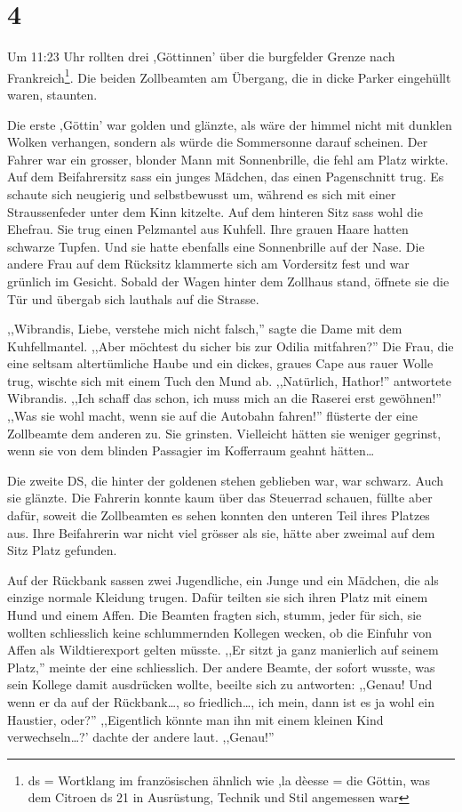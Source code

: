 \section*{4}

Um 11:23 Uhr rollten drei ,Göttinnen' über die burgfelder Grenze nach Frankreich\footnote{ds = Wortklang im französischen ähnlich wie ,la dèesse = die Göttin, was dem Citroen ds 21 in Ausrüstung, Technik und Stil angemessen war}. Die beiden Zollbeamten am Übergang, die in dicke Parker eingehüllt waren, staunten.

 Die erste ,Göttin' war golden und glänzte, als wäre der himmel nicht mit dunklen Wolken verhangen, sondern als würde die Sommersonne darauf scheinen. Der Fahrer war ein grosser, blonder Mann mit Sonnenbrille, die fehl am Platz wirkte. Auf dem Beifahrersitz sass ein junges Mädchen, das einen Pagenschnitt trug. Es schaute sich neugierig und selbstbewusst um, während es sich mit einer Straussenfeder unter dem Kinn kitzelte.  Auf dem hinteren Sitz sass wohl die Ehefrau. Sie trug einen Pelzmantel aus Kuhfell. Ihre grauen Haare hatten schwarze Tupfen. Und sie hatte ebenfalls eine Sonnenbrille auf der Nase. Die andere Frau auf dem Rücksitz klammerte sich am Vordersitz fest und war grünlich im Gesicht. Sobald der Wagen hinter dem Zollhaus stand, öffnete sie die Tür und übergab sich lauthals auf die Strasse. 
 
 ,,Wibrandis, Liebe, verstehe mich nicht falsch,'' sagte die Dame mit dem Kuhfellmantel. ,,Aber möchtest du sicher bis zur Odilia mitfahren?'' Die Frau, die eine seltsam altertümliche Haube und ein dickes, graues Cape aus rauer Wolle trug, wischte sich mit einem Tuch den Mund ab. ,,Natürlich, Hathor!'' antwortete Wibrandis. ,,Ich schaff das schon, ich muss mich an die Raserei erst gewöhnen!'' ,,Was sie wohl macht, wenn sie auf die Autobahn fahren!'' flüsterte der eine Zollbeamte dem anderen zu. Sie grinsten. Vielleicht hätten sie weniger gegrinst, wenn sie von dem blinden Passagier im Kofferraum geahnt hätten\dots
 
Die zweite DS, die hinter der goldenen stehen geblieben war, war schwarz. Auch sie glänzte. Die Fahrerin konnte kaum über das Steuerrad schauen, füllte aber dafür, soweit die Zollbeamten es sehen konnten den unteren Teil ihres Platzes aus. Ihre Beifahrerin war nicht viel grösser als sie, hätte aber zweimal auf dem Sitz Platz gefunden.

Auf der Rückbank sassen zwei Jugendliche, ein Junge und ein Mädchen, die als einzige normale Kleidung trugen. Dafür teilten sie sich ihren Platz mit einem Hund und einem Affen. Die Beamten fragten sich, stumm, jeder für sich, sie wollten schliesslich keine schlummernden Kollegen wecken, ob die Einfuhr von Affen als Wildtierexport gelten müsste. ,,Er sitzt ja ganz manierlich auf seinem Platz,'' meinte der eine schliesslich. Der andere Beamte, der sofort wusste, was sein Kollege damit ausdrücken wollte, beeilte sich zu antworten: ,,Genau! Und wenn er da auf der Rückbank\dots , so friedlich\dots , ich mein, dann ist es ja wohl ein Haustier, oder?'' ,,Eigentlich könnte man ihn mit einem kleinen Kind verwechseln\dots ?' dachte der andere laut. ,,Genau!''
 
